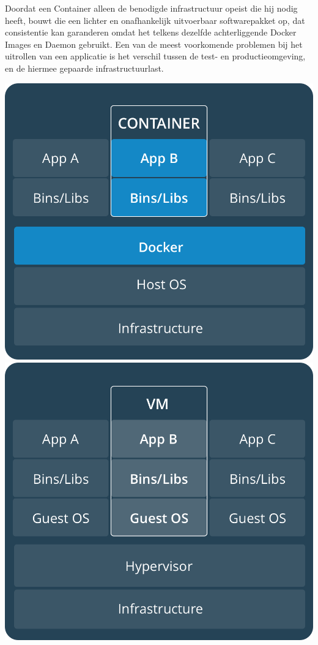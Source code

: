 Doordat een Container alleen de benodigde infrastructuur opeist die hij nodig heeft, bouwt die een lichter en onafhankelijk uitvoerbaar softwarepakket op, dat consistentie kan garanderen omdat het telkens dezelfde achterliggende Docker Images en Daemon gebruikt. Een van de meest voorkomende problemen bij het uitrollen van een applicatie is het verschil tussen de test- en productieomgeving, en de hiermee gepaarde infrastructuurlast.

\begin{center}
	\includegraphics[scale=0.2]{img/containers.png}
	\includegraphics[scale=0.2]{img/vms.png}
\end{center}

